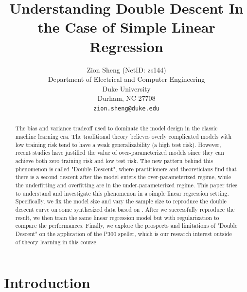 \documentclass{article}
\title{Understanding Double Descent In the Case of Simple Linear Regression}
\author{
	Zion Sheng (NetID: zs144)\\
	Department of Electrical and Computer Engineering\\
	Duke University\\
	Durham, NC 27708 \\
	\texttt{zion.sheng@duke.edu} \\
}
\date{} %
\begin{document}
\maketitle

\begin{abstract}
	The bias and variance tradeoff used to dominate the model design in the classic machine learning era. The traditional theory believes overly complicated models with low training risk tend to have a weak generalizability (a high test risk). However, recent studies have justified the value of over-parameterized models since they can achieve both zero training risk and low test risk. The new pattern behind this phenomenon is called "Double Descent", where practitioners and theoreticians find that there is a second descent after the model enters the over-parameterized regime, while the underfitting and overfitting are in the under-parameterized regime. This paper tries to understand and investigate this phenomenon in a simple linear regression setting. Specifically, we fix the model size and vary the sample size to reproduce the double descent curve on some synthesized data based on \cite{nakkiran2019more}. After we successfully reproduce the result, we then train the same linear regression model but with regularization to compare the performances. Finally, we explore the prospects and limitations of "Double Descent" on the application of the P300 speller, which is our research interest outside of theory learning in this course.
\end{abstract}




\section{Introduction} \label{Introduction}
\end{document}
